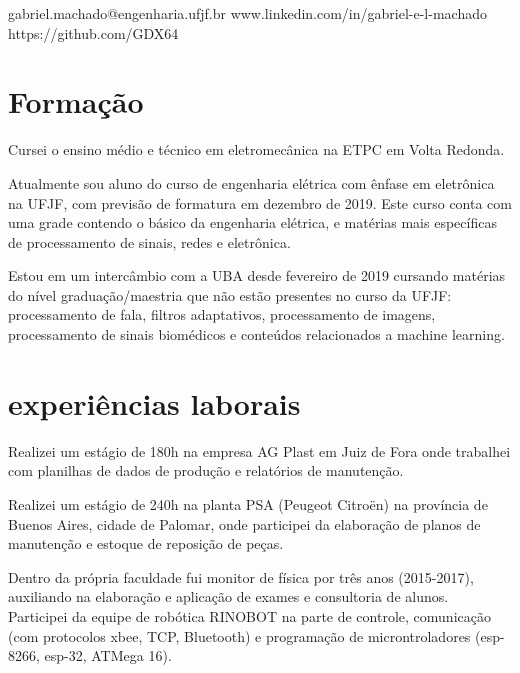 \documentclass{my_cv}
\begin{document}
	
	
	\begin{multicols}{2}
		
	{gabriel.machado@engenharia.ufjf.br}
	{www.linkedin.com/in/gabriel-e-l-machado}
	{https://github.com/GDX64}
		
	\section{Formação}
	\justify
	Cursei o ensino médio e técnico em eletromecânica na ETPC em Volta Redonda.
	
	Atualmente sou aluno do curso de engenharia elétrica com ênfase em eletrônica na UFJF, com previsão de formatura em dezembro de 2019. Este curso conta com uma grade contendo o básico da engenharia elétrica, e matérias mais específicas de processamento de sinais, redes e eletrônica.
	
	Estou em um intercâmbio com a UBA desde fevereiro de 2019 cursando matérias do nível graduação/maestria que não estão presentes no curso da UFJF: processamento de fala, filtros adaptativos, processamento de imagens, processamento de sinais biomédicos e conteúdos relacionados a machine learning.
	
	\section{experiências laborais}
	Realizei um estágio de 180h na empresa AG Plast em Juiz de Fora onde trabalhei com planilhas de dados de produção e relatórios de manutenção.
	
	Realizei um estágio de 240h na planta PSA (Peugeot Citroën) na província de Buenos Aires, cidade de Palomar, onde participei da elaboração de planos de manutenção e estoque de reposição de peças.
	
	Dentro da própria faculdade fui monitor de física por três anos (2015-2017), auxiliando na elaboração e aplicação de exames e consultoria de alunos. Participei da equipe de robótica RINOBOT na parte de controle, comunicação (com protocolos  xbee, TCP, Bluetooth) e programação de microntroladores (esp-8266, esp-32, ATMega 16).
	

\end{multicols}
\end{document}
